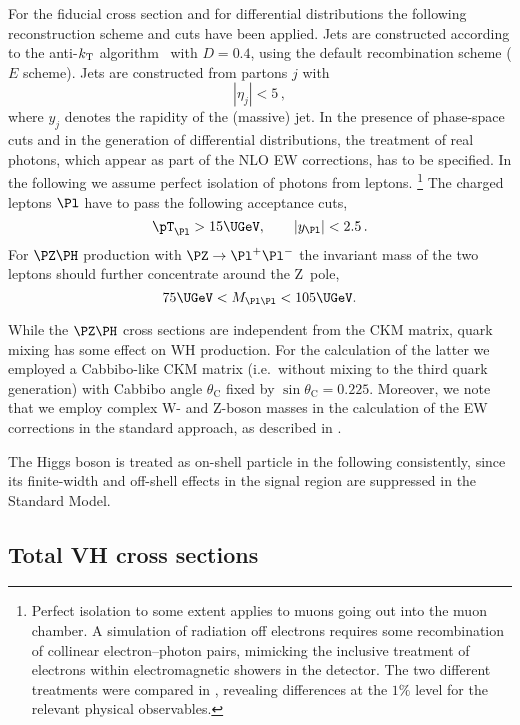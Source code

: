 For the fiducial cross section and for 
differential distributions the following reconstruction scheme
and cuts have been applied.
Jets are constructed according to the anti-$k\sb{\scriptstyle\mathrm{T}}$ algorithm~\cite{Cacciari:2008gp} with
$D=0.4$, using the default recombination scheme ($E$ scheme).  
Jets are constructed from partons $j$ with
\begin{equation}
\label{eq:VH_cuts1}
|\eta_j| < 5\,,
\end{equation}
where $y_j$ denotes the rapidity of the (massive) jet.
In the presence of phase-space cuts and in the generation of
differential distributions, the treatment of real photons,
which appear as part of the NLO EW corrections, has to be specified.
In the following we assume perfect isolation of photons from leptons.%
\footnote{Perfect isolation to some extent applies to
muons going out into the muon chamber. A simulation of radiation off
electrons requires some recombination of collinear electron--photon pairs,
mimicking the inclusive treatment of electrons within electromagnetic showers
in the detector. 
The two different treatments were compared in , revealing
differences at the $1\%$ level for the relevant physical observables.}
The charged leptons $\Pl$ have to pass the following acceptance cuts,
\begin{equation}
\label{eq:VH_cuts2}
{\pT}_{\Pl} > 15\UGeV, \qquad
|y_{\Pl}| <2.5\,.
\end{equation}
For $\PZ\PH$ production with $\PZ\to\Pl^+\Pl^-$ the invariant mass of the two leptons
should further concentrate around the Z~pole,
\begin{equation}
75\UGeV < M_{\Pl\Pl} < 105\UGeV.
\end{equation}

While the $\PZ\PH$ cross sections are independent
from the CKM matrix, quark mixing has some effect on WH production.
For the calculation of the latter we employed a Cabbibo-like CKM matrix
(i.e.\ without mixing to the third quark generation) with Cabbibo angle
$\theta_{\mathrm{C}}$ fixed by $\sin\theta_{\mathrm{C}}=0.225$.
Moreover, we note that we employ complex W- and Z-boson masses in the
calculation of the EW corrections in the standard \HAWK{} approach, 
as described in .

The Higgs boson is treated as on-shell particle in the following consistently,
since its finite-width and off-shell effects in the signal region are
suppressed in the Standard Model.


\subsection{Total VH cross sections}

